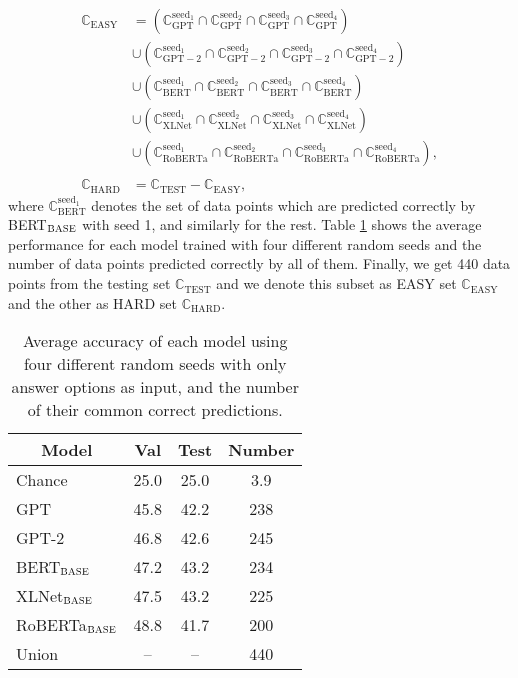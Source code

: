 \documentclass{article} \usepackage{iclr2020_conference,times}
\def\sC{{\mathbb{C}}}
\newcommand\bertbase{BERT$_{\small \textsc{BASE}}$\xspace}
\newcommand\xlnetbase{XLNet$_{\small \textsc{BASE}}$\xspace}
\newcommand\robertabase{RoBERTa$_{\small \textsc{BASE}}$\xspace}
\begin{document}
\begin{equation}
	\begin{aligned}
	\sC_{\mathrm{EASY}} &=  (\sC_{\mathrm{GPT}}^{\mathrm{seed_1}} \cap \sC_{\mathrm{GPT}}^{\mathrm{seed_2}} \cap \sC_{\mathrm{GPT}}^{\mathrm{seed_3}} \cap \sC_{\mathrm{GPT}}^{\mathrm{seed_4}}) \\
	    & \cup (\sC_{\mathrm{GPT-2}}^{\mathrm{seed_1}} \cap \sC_{\mathrm{GPT-2}}^{\mathrm{seed_2}} \cap \sC_{\mathrm{GPT-2}}^{\mathrm{seed_3}} \cap \sC_{\mathrm{GPT-2}}^{\mathrm{seed_4}}) \\
	    & \cup (\sC_{\mathrm{BERT}}^{\mathrm{seed_1}} \cap \sC_{\mathrm{BERT}}^{\mathrm{seed_2}} \cap \sC_{\mathrm{BERT}}^{\mathrm{seed_3}} \cap \sC_{\mathrm{BERT}}^{\mathrm{seed_4}}) \\
		& \cup (\sC_{\mathrm{XLNet}}^{\mathrm{seed_1}} \cap \sC_{\mathrm{XLNet}}^{\mathrm{seed_2}} \cap \sC_{\mathrm{XLNet}}^{\mathrm{seed_3}} \cap \sC_{\mathrm{XLNet}}^{\mathrm{seed_4}}) \\
		& \cup (\sC_{\mathrm{RoBERTa}}^{\mathrm{seed_1}} \cap \sC_{\mathrm{RoBERTa}}^{\mathrm{seed_2}} \cap \sC_{\mathrm{RoBERTa}}^{\mathrm{seed_3}} \cap \sC_{\mathrm{RoBERTa}}^{\mathrm{seed_4}}),\\
		& \\
	\sC_{\mathrm{HARD}} &= \sC_{\mathrm{TEST}} - \sC_{\mathrm{EASY}},
	\end{aligned}
\end{equation}
where $\sC_{\mathrm{BERT}}^{\mathrm{seed_1}}$ denotes the set of data points which are predicted correctly by \bertbase with seed 1, and similarly for the rest. Table \ref{option-input} shows the average performance for each model trained with four different random seeds and the number of data points predicted correctly by all of them. Finally, we get 440 data points from the testing set $\sC_{\mathrm{TEST}}$ and we denote this subset as EASY set $\sC_{\mathrm{EASY}}$ and the other as HARD set $\sC_{\mathrm{HARD}}$. 

\begin{table}[ht]
	\small
	\caption{Average accuracy of each model using four different random seeds with only answer options as input, and the number of their common correct predictions.}
	\label{option-input}
	\begin{center}
		\begin{tabular}{lccc}
			\multicolumn{1}{c}{\bf Model}  &\multicolumn{1}{c}{\bf Val} &\multicolumn{1}{c}{\bf Test} &\multicolumn{1}{c}{\bf Number}
			\\ \hline 
			Chance & 25.0 & 25.0 & 3.9\\ 
			\hline
			GPT & 45.8 & 42.2 & 238 \\
			GPT-2 & 46.8 & 42.6 & 245\\
			\bertbase   &47.2 &43.2 & 234 \\
			\xlnetbase            &47.5 &43.2 & 225 \\
			\robertabase             &48.8 &41.7 & 200\\
			\hline
			Union & -- & -- & 440
		\end{tabular}
	\end{center}
\end{table}
\end{document}
